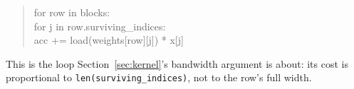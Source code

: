 \documentclass[11pt,twoside]{book}
\begin{document}
\begin{quote}
\ttfamily
for row in blocks: \\
\quad for j in row.surviving\_indices: \\
\quad\quad acc += load(weights[row][j]) * x[j]
\end{quote}

This is the loop Section~\ref{sec:kernel}'s bandwidth argument is about:
its cost is proportional to \texttt{len(surviving\_indices)}, not to the
row's full width.
\end{document}
